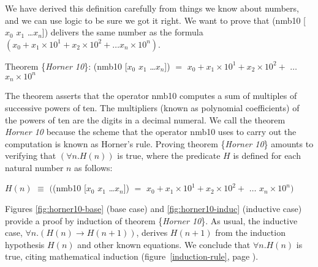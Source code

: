 \vspace{-2mm}   %
We have derived this definition carefully
from things we know about numbers,
and we can use logic to be sure we got it right.
We want to prove that
\textsf{(nmb10 [$x_0$ $x_1$ \dots $x_{n}$])}
delivers the same number as the formula
$(x_0 + x_1 \times 10^1 + x_2 \times 10^2 + \dots x_{n} \times 10^{n})$.
\begin{center}
\label{horner10-thm}Theorem
\{\emph{Horner 10}\}:
\textsf{(nmb10 [$x_0$ $x_1$ \dots $x_{n}$])} $=$
$x_0 + x_1 \times 10^1 + x_2 \times 10^2 +$ $\dots$ $x_{n} \times 10^{n}$
\end{center}
\vspace{2mm}

The theorem asserts that the operator \textsf{nmb10}
computes a sum of multiples of successive powers of ten.
The multipliers
(known as polynomial coefficients)
of the powers of ten are the digits in a decimal numeral.
We call the theorem \emph{Horner 10} because
the scheme that the operator \textsf{nmb10} uses to carry out the computation is
known as Horner's rule.
Proving theorem \{\emph{Horner 10}\} amounts to
verifying that $(\forall n.H(n))$ is true,
where the predicate $H$ is defined for each natural number $n$
as follows:
\begin{center}
$H(n)$ $\equiv$ $($\textsf{(nmb10 [$x_0$ $x_1$ \dots $x_{n}$])} $=$
$x_0 + x_1 \times 10^1 + x_2 \times 10^2 +$ $\dots$ $x_{n} \times 10^{n})$
\end{center}

Figures \ref{fig:horner10-base} (base case) and \ref{fig:horner10-induc}
(inductive case) provide a proof by induction of theorem \{\emph{Horner 10}\}.
As usual, the inductive case, $\forall n. (H(n) \rightarrow H(n+1))$,
derives $H(n+1)$ from the induction hypothesis $H(n)$ and other known
equations.
We conclude that $\forall n.H(n)$ is true,
citing mathematical induction
(figure~\ref{induction-rule}, page \pageref{induction-rule}).

